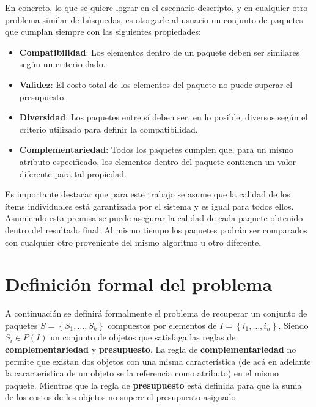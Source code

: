 En concreto, lo que se quiere lograr en el escenario descripto, y en cualquier otro problema similar de búsquedas, es otorgarle al usuario un conjunto de paquetes que cumplan siempre con las siguientes propiedades: 

\begin{itemize}
\item \textbf{Compatibilidad}: Los elementos dentro de un paquete deben ser similares según un criterio dado.
\item \textbf{Validez}: El costo total de los elementos del paquete no puede superar el presupuesto.
\item \textbf{Diversidad}: Los paquetes entre sí deben ser, en lo posible, diversos según el criterio utilizado para definir la compatibilidad.
\item \textbf{Complementariedad}: Todos los paquetes cumplen que, para un mismo atributo especificado, los elementos dentro del paquete contienen un valor diferente para tal propiedad.
\end{itemize}

Es importante destacar que para este trabajo se asume que la calidad de los ítems individuales está garantizada por el sistema y es igual para todos ellos. Asumiendo esta premisa se puede asegurar la calidad de cada paquete obtenido dentro del resultado final. Al mismo tiempo los paquetes podrán ser comparados con cualquier otro proveniente del mismo algoritmo u otro diferente.

\section{Definición formal del problema}\label{introduccion:problemaFormal}
A continuación se definirá formalmente el problema de recuperar un conjunto de paquetes $S = \left\{S_1, \ldots, S_k\right\}$ compuestos por elementos de $I=\left\{i_1,\ldots, i_n\right\}$. Siendo $S_i \in P(I)$ un conjunto de objetos que satisfaga las reglas de \textbf{complementariedad} y \textbf{presupuesto}. La regla de \textbf{complementariedad} no permite que existan dos objetos con una misma característica (de acá en adelante la característica de un objeto se la referencia como atributo) en el mismo paquete. Mientras que la regla de \textbf{presupuesto} está definida para que la suma de los costos de los objetos no supere el presupuesto asignado.

